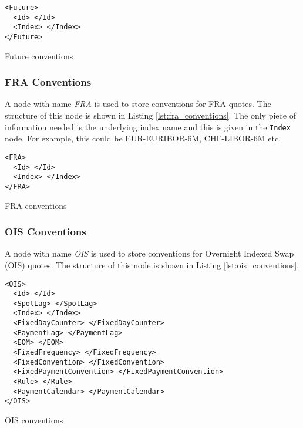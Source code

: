 \begin{listing}[H]
\begin{verbatim}
<Future>
  <Id> </Id>
  <Index> </Index>
</Future>
\end{verbatim}
\caption{Future conventions}
\label{lst:future_conventions}
\end{listing}

\subsubsection{FRA Conventions}
A node with name \emph{FRA} is used to store conventions for FRA quotes. The structure of this node is shown in Listing 
\ref{lst:fra_conventions}. The only piece of information needed is the underlying index name and this is given in the 
\lstinline!Index! node. For example, this could be EUR-EURIBOR-6M, CHF-LIBOR-6M etc.

\begin{listing}[H]
\begin{verbatim}
<FRA>
  <Id> </Id>
  <Index> </Index>
</FRA>
\end{verbatim}
\caption{FRA conventions}
\label{lst:fra_conventions}
\end{listing}

\subsubsection{OIS Conventions}

A node with name \emph{OIS} is used to store conventions for Overnight Indexed Swap (OIS) quotes. The structure of this
node is shown in Listing \ref{lst:ois_conventions}.

\begin{listing}[H]
\begin{verbatim}
<OIS>
  <Id> </Id>
  <SpotLag> </SpotLag>
  <Index> </Index>
  <FixedDayCounter> </FixedDayCounter>
  <PaymentLag> </PaymentLag>
  <EOM> </EOM>
  <FixedFrequency> </FixedFrequency>
  <FixedConvention> </FixedConvention>
  <FixedPaymentConvention> </FixedPaymentConvention>
  <Rule> </Rule>
  <PaymentCalendar> </PaymentCalendar>
</OIS>
\end{verbatim}
\caption{OIS conventions}
\label{lst:ois_conventions}
\end{listing}

